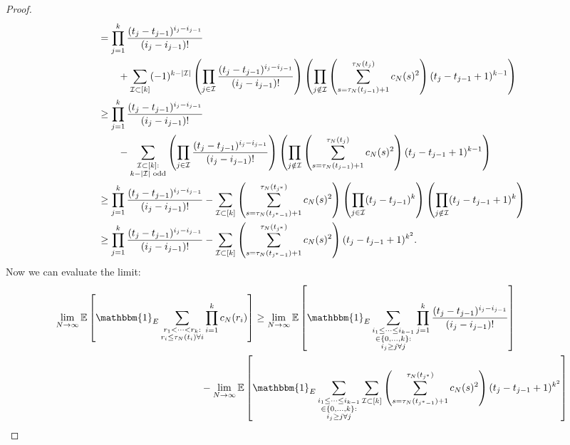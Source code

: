 \documentclass{article}
\newcommand{\E}{\mathbb{E}}
\newcommand{\1}[1]{\mathbbm{1}_{#1}}
\begin{document}
\begin{proof}
\begin{align}
&= \prod_{j=1}^k \frac{(t_j - t_{j-1})^{i_j - i_{j-1}}}{(i_j - i_{j-1})!}  \notag\\
&\qquad+ \sum_{\mathcal{I} \subset [k]} (-1)^{k-|\mathcal{I}|} \left( \prod_{j\in\mathcal{I}} \frac{(t_j - t_{j-1})^{i_j - i_{j-1}}}{(i_j - i_{j-1})!} \right)
\left( \prod_{j\notin\mathcal{I}} \left( \sum_{s=\tau_N(t_{j-1})+1}^{\tau_N(t_j)} c_N(s)^2 \right) ( t_j - t_{j-1} +1 )^{k-1} \right) \notag\\
&\geq \prod_{j=1}^k \frac{(t_j - t_{j-1})^{i_j - i_{j-1}}}{(i_j - i_{j-1})!}  \notag\\
&\qquad- \sum_{\substack{\mathcal{I} \subset [k]:\\k-|\mathcal{I}| \text{ odd} }} \left( \prod_{j\in\mathcal{I}} \frac{(t_j - t_{j-1})^{i_j - i_{j-1}}}{(i_j - i_{j-1})!} \right)
\left( \prod_{j\notin\mathcal{I}} \left( \sum_{s=\tau_N(t_{j-1})+1}^{\tau_N(t_j)} c_N(s)^2 \right) ( t_j - t_{j-1} +1 )^{k-1} \right) \notag\\
&\geq \prod_{j=1}^k \frac{(t_j - t_{j-1})^{i_j - i_{j-1}}}{(i_j - i_{j-1})!} 
- \sum_{\mathcal{I} \subset [k]} 
\left( \sum_{s=\tau_N(t_{j^*-1})+1}^{\tau_N(t_{j^*})} c_N(s)^2 \right)
\left( \prod_{j\in\mathcal{I}} ( t_j - t_{j-1} )^k \right)
\left( \prod_{j\notin\mathcal{I}} ( t_j - t_{j-1} +1 )^k \right) \notag\\
&\geq \prod_{j=1}^k \frac{(t_j - t_{j-1})^{i_j - i_{j-1}}}{(i_j - i_{j-1})!}
- \sum_{\mathcal{I} \subset [k]} 
\left( \sum_{s=\tau_N(t_{j^*-1})+1}^{\tau_N(t_{j^*})} c_N(s)^2 \right)
( t_j - t_{j-1} +1 )^{k^2} .
\end{align}
Now we can evaluate the limit:
\begin{align}
\lim_{N\to\infty} \E &\left[ \1{E} \sum_{\substack{r_1<\dots<r_k :\\ r_i\leq \tau_N(t_i) \forall i}} \prod_{i=1}^k c_N(r_i) \right] 
\geq \lim_{N\to\infty} \E \left[ \1{E} \sum_{\substack{i_1\leq \dots\leq i_{k-1}\\ \in \{0,\dots,k\} :\\ i_j \geq j \forall j}}
\prod_{j=1}^k \frac{(t_j - t_{j-1})^{i_j - i_{j-1}}}{(i_j - i_{j-1})!} \right] \notag\\
&\hspace{4cm}- \lim_{N\to\infty} \E \left[ \1{E} \sum_{\substack{i_1\leq \dots\leq i_{k-1}\\ \in \{0,\dots,k\} :\\ i_j \geq j \forall j}}
\sum_{\mathcal{I} \subset [k]} 
\left( \sum_{s=\tau_N(t_{j^*-1})+1}^{\tau_N(t_{j^*})} c_N(s)^2 \right)
( t_j - t_{j-1} +1 )^{k^2} \right] \notag\\

\end{align}
\end{proof}
\end{document}
